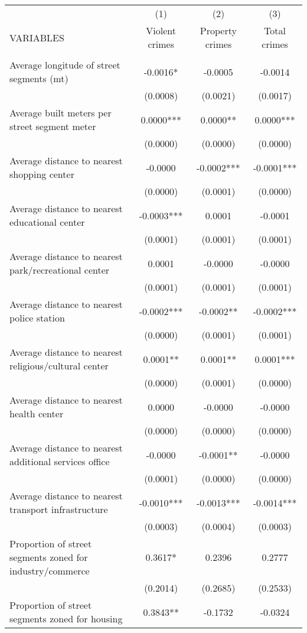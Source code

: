 \documentclass[]{article}
\begin{document}
\begin{tabular}{lccc} \hline
 & (1) & (2) & (3) \\
VARIABLES & Violent crimes & Property crimes & Total crimes \\ \hline
 &  &  &  \\
Average longitude of street segments (mt) & -0.0016* & -0.0005 & -0.0014 \\
 & (0.0008) & (0.0021) & (0.0017) \\
Average built meters per street segment meter & 0.0000*** & 0.0000** & 0.0000*** \\
 & (0.0000) & (0.0000) & (0.0000) \\
Average distance to nearest shopping center & -0.0000 & -0.0002*** & -0.0001*** \\
 & (0.0000) & (0.0001) & (0.0000) \\
Average distance to nearest educational center & -0.0003*** & 0.0001 & -0.0001 \\
 & (0.0001) & (0.0001) & (0.0001) \\
Average distance to nearest park/recreational center & 0.0001 & -0.0000 & -0.0000 \\
 & (0.0001) & (0.0001) & (0.0001) \\
Average distance to nearest police station & -0.0002*** & -0.0002** & -0.0002*** \\
 & (0.0000) & (0.0001) & (0.0001) \\
Average distance to nearest religious/cultural center & 0.0001** & 0.0001** & 0.0001*** \\
 & (0.0000) & (0.0001) & (0.0000) \\
Average distance to nearest health center & 0.0000 & -0.0000 & -0.0000 \\
 & (0.0000) & (0.0000) & (0.0000) \\
Average distance to nearest additional services office & -0.0000 & -0.0001** & -0.0000 \\
 & (0.0001) & (0.0000) & (0.0000) \\
Average distance to nearest transport infrastructure & -0.0010*** & -0.0013*** & -0.0014*** \\
 & (0.0003) & (0.0004) & (0.0003) \\
Proportion of street segments zoned for industry/commerce & 0.3617* & 0.2396 & 0.2777 \\
 & (0.2014) & (0.2685) & (0.2533) \\
Proportion of street segments zoned for housing & 0.3843** & -0.1732 & -0.0324 \\

\end{tabular}
\end{document}

